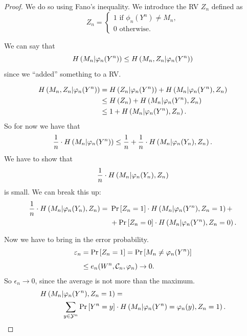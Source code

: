 \begin{proof}
	We do so using Fano's inequality.
	We introduce the \ac{RV} $Z_n$ defined as
	\begin{equation*}
		Z_n =
			\begin{cases}
				1 \text{ if } \phi_n(Y^n) \neq M_n,\\
				0 \text{ otherwise.}
			\end{cases} 
	\end{equation*}

	We can say that
	\begin{equation*}
		H\left({M_n | \varphi_n(Y^n)}\right) \le
		H\left({M_n, Z_n | \varphi_n(Y^n)}\right)
	\end{equation*}
	since we ``added'' something to a \ac{RV}.

	\begin{align*}
		H\left({M_n, Z_n | \varphi_n(Y^n)}\right)
		& =
		H\left({Z_n | \varphi_n(Y^n)}\right) +
		H\left({M_n | \varphi_n(Y^n), Z_n}\right)
		\\
		& \le
		H\left({Z_n}\right) +
		H\left({M_n | \varphi_n(Y^n), Z_n}\right)
		\\
		& \le
		1 +
		H\left({M_n | \varphi_n(Y^n), Z_n}\right).
	\end{align*}
	So for now we have that
	\begin{equation*}
		\frac{1}{n} \cdot H\left({M_n | \varphi_n(Y^n)}\right) \le
		\frac{1}{n} + \frac{1}{n} \cdot H\left({M_n | \varphi_n(Y_n), Z_n}\right).
	\end{equation*}
	We have to show that
	\begin{equation*}
		\frac{1}{n} \cdot H\left({M_n | \varphi_n(Y_n), Z_n}\right)
	\end{equation*}
	is small.
	We can break this up:
	\begin{equation} \label{eq:eqbreak}
	\begin{aligned}
		\frac{1}{n} \cdot H\left({M_n | \varphi_n(Y_n), Z_n}\right)
		= &~
		\mathop{\mathrm{Pr}}\limits_{} \left[ {Z_n = 1} \right] \cdot H\left({M_n | \varphi_n(Y^n), Z_n = 1}\right) +
		\\
		&~+
		\mathop{\mathrm{Pr}}\limits_{} \left[ {Z_n = 0} \right] \cdot H\left({M_n | \varphi_n(Y^n), Z_n = 0}\right).  
	\end{aligned}
	\end{equation}
	Now we have to bring in the error probability.
	\begin{align*}
	  \varepsilon_n
	  & =
	  \mathop{\mathrm{Pr}}\limits_{} \left[ {Z_n = 1} \right] =
	  \mathop{\mathrm{Pr}}\limits_{} \left[ {M_n \neq \varphi_n(Y^n)} \right]
	  \\
	  & \le
	  e_n(W^n, \mathcal{C}_n, \varphi_n) \to 0.
	\end{align*}
	So $\epsilon_n \to 0$, since the average is not more than the maximum.
	\begin{align*}
		H\left({M_n | \varphi_n(Y^n), Z_n = 1}\right)
		& =
		\\
		\sum_{y \in \mathcal{Y}^n} \mathop{\mathrm{Pr}}\limits_{} \left[ {Y^n = y} \right]
		& \cdot
		H\left({M_n | \varphi_n(Y^n) = \varphi_n(y), Z_n = 1}\right).
	\end{align*}


\end{proof}
